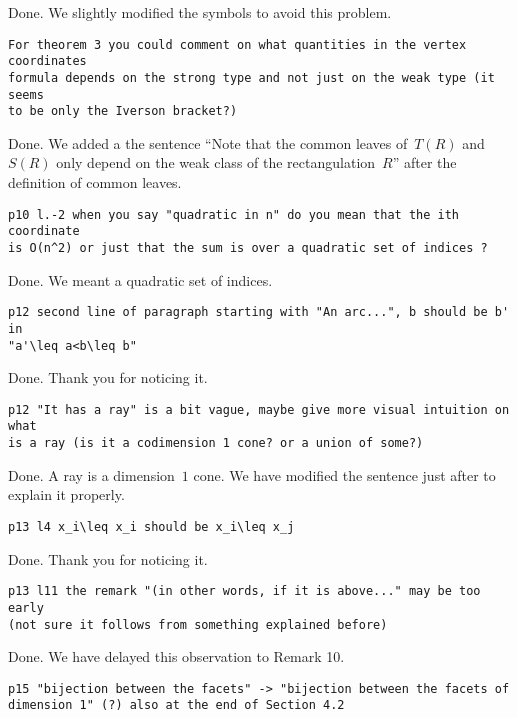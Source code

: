 \documentclass{article}
\begin{document}
Done. We slightly modified the symbols to avoid this problem.

\begin{verbatim}
For theorem 3 you could comment on what quantities in the vertex coordinates 
formula depends on the strong type and not just on the weak type (it seems 
to be only the Iverson bracket?)
\end{verbatim}

Done. We added a the sentence ``Note that the common leaves of~$T(R)$ and~$S(R)$ only depend on the weak class of the rectangulation~$R$'' after the definition of common leaves.

\begin{verbatim}
p10 l.-2 when you say "quadratic in n" do you mean that the ith coordinate 
is O(n^2) or just that the sum is over a quadratic set of indices ?
\end{verbatim}

Done. We meant a quadratic set of indices.

\begin{verbatim}
p12 second line of paragraph starting with "An arc...", b should be b' in 
"a'\leq a<b\leq b" 
\end{verbatim}

Done. Thank you for noticing it.

\begin{verbatim}
p12 "It has a ray" is a bit vague, maybe give more visual intuition on what 
is a ray (is it a codimension 1 cone? or a union of some?)
\end{verbatim}

Done. A ray is a dimension~$1$ cone. We have modified the sentence just after to explain it properly.

\begin{verbatim}
p13 l4 x_i\leq x_i should be x_i\leq x_j
\end{verbatim}

Done. Thank you for noticing it.

\begin{verbatim}
p13 l11 the remark "(in other words, if it is above..." may be too early 
(not sure it follows from something explained before)
\end{verbatim}

Done. We have delayed this observation to Remark 10.

\begin{verbatim}
p15 "bijection between the facets" -> "bijection between the facets of 
dimension 1" (?) also at the end of Section 4.2
\end{verbatim}
\end{document}
